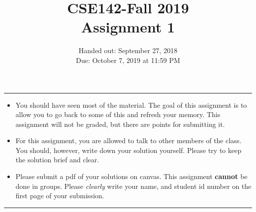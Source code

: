 \documentclass{article}
\title{CSE142-Fall 2019\\ Assignment 1}
\date{Handed out: September 27, 2018 \\ Due: October 7, 2019 at 11:59 PM}
\begin{document}
\maketitle

\noindent\rule{18cm}{0.4pt}

\begin{itemize}
\item You should have seen most of the material. The goal of this assignment is to allow you to go back to some of this and refresh your memory. This assignment will not be graded, but there are points for submitting it.

\item For this assignment, you are allowed to talk to other members of the class. You should, however, write down your solution yourself. Please try to keep the solution brief and clear.

\item Please submit a pdf of your solutions on canvas. This assignment \textbf{cannot} be done in groups. Please \emph{clearly} write your name, and student id number on the first page of your submission.    
\end{itemize}

\noindent\rule{18cm}{0.4pt}
\end{document}
